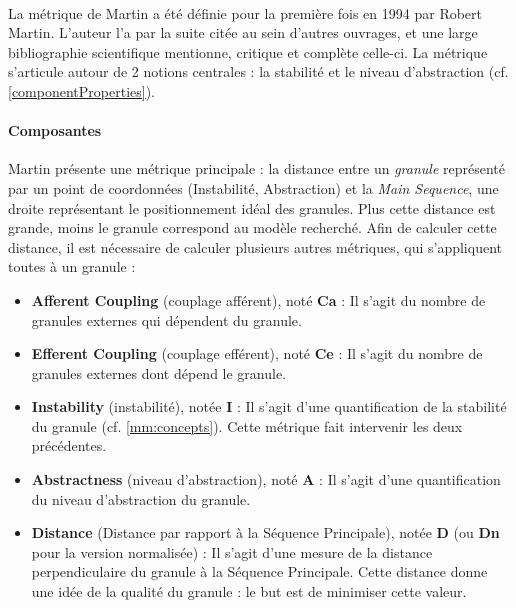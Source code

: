 \documentclass{scrartcl}
\begin{document}
    \paragraph{}La métrique de Martin a été définie pour la première fois en 1994 par Robert Martin\cite{Martin:1994}. L'auteur l'a par la suite citée au sein d'autres ouvrages\cite{Martin:2003}, et une large bibliographie scientifique mentionne, critique et complète celle-ci\cite{HyryLepp:2009}\cite{BUmetric:2016}\cite{KaurShar:2015}\cite{Spinellis:2006}\cite{Pressman:2000}. La métrique s'articule autour de 2 notions centrales : la stabilité et le niveau d'abstraction (cf. \ref{componentProperties}).


    \paragraph{Composantes}Martin présente une métrique principale : la distance entre un \textit{granule} représenté par un point de coordonnées (Instabilité, Abstraction) et la \emph{Main Sequence}, une droite représentant le positionnement idéal des granules. Plus cette distance est grande, moins le granule correspond au modèle recherché. Afin de calculer cette distance, il est nécessaire de calculer plusieurs autres métriques, qui s'appliquent toutes à un granule :
    \begin{itemize}
        \item \textbf{Afferent Coupling} (couplage afférent), noté \textbf{Ca} : Il s'agit du nombre de granules externes qui dépendent du granule.
        \item \textbf{Efferent Coupling} (couplage efférent), noté \textbf{Ce} : Il s'agit du nombre de granules externes dont dépend le granule.
        \item \textbf{Instability} (instabilité), notée \textbf{I} : Il s'agit d'une quantification de la stabilité du granule (cf. \ref{mm:concepts}). Cette métrique fait intervenir les deux précédentes.
        \item \textbf{Abstractness} (niveau d'abstraction), noté \textbf{A} : Il s'agit d'une quantification du niveau d'abstraction du granule.
        \item \textbf{Distance} (Distance par rapport à la Séquence Principale), notée \textbf{D} (ou \textbf{Dn} pour la version normalisée) : Il s'agit d'une mesure de la distance perpendiculaire du granule à la Séquence Principale. Cette distance donne une idée de la qualité du granule : le but est de minimiser cette valeur.
    \end{itemize}
\end{document}
